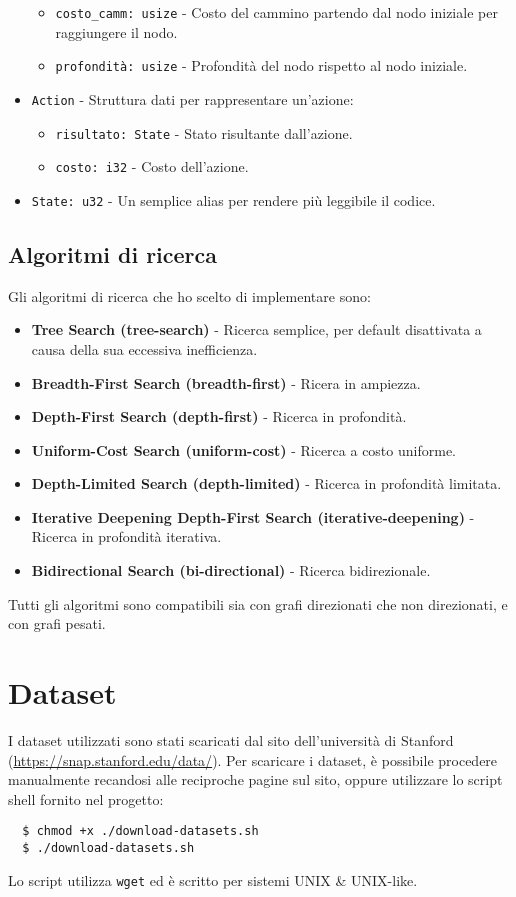 \documentclass{ol-softwaremanual}
\begin{document}
\begin{itemize}
\begin{itemize}
		      \item \texttt{costo\_camm: usize} - Costo del cammino partendo dal nodo iniziale per raggiungere il nodo.
		      \item \texttt{profondità: usize} - Profondità del nodo rispetto al nodo iniziale.
	      \end{itemize}
	\item \texttt{Action} - Struttura dati per rappresentare un'azione:
	      \begin{itemize}
		      \item \texttt{risultato: State} - Stato risultante dall'azione.
		      \item \texttt{costo: i32} - Costo dell'azione.
	      \end{itemize}
	\item \texttt{State: u32} - Un semplice alias per rendere più leggibile il codice.
\end{itemize}
\newpage
\subsection{Algoritmi di ricerca}
Gli algoritmi di ricerca che ho scelto di implementare sono:
\begin{itemize}
	\item \textbf{Tree Search (tree-search)} - Ricerca semplice, per default disattivata a causa della sua eccessiva inefficienza.
	\item \textbf{Breadth-First Search (breadth-first)} - Ricera in ampiezza.
	\item \textbf{Depth-First Search (depth-first)} - Ricerca in profondità.
	\item \textbf{Uniform-Cost Search (uniform-cost)} - Ricerca a costo uniforme.
	\item \textbf{Depth-Limited Search (depth-limited)} - Ricerca in profondità limitata.
	\item \textbf{Iterative Deepening Depth-First Search (iterative-deepening)} - Ricerca in profondità iterativa.
	\item \textbf{Bidirectional Search (bi-directional)} - Ricerca bidirezionale.
\end{itemize}

Tutti gli algoritmi sono compatibili sia con grafi direzionati che non direzionati, e con grafi pesati.

\section{Dataset}\label{sec:dataset}
I dataset utilizzati sono stati scaricati dal sito dell'università di Stanford (\url{https://snap.stanford.edu/data/}).
Per scaricare i dataset, è possibile procedere manualmente recandosi alle reciproche pagine sul sito, oppure utilizzare lo script shell fornito nel progetto:
\begin{lstlisting}
  $ chmod +x ./download-datasets.sh
  $ ./download-datasets.sh
\end{lstlisting}
Lo script utilizza \texttt{wget} ed è scritto per sistemi UNIX \& UNIX-like.
\end{document}
